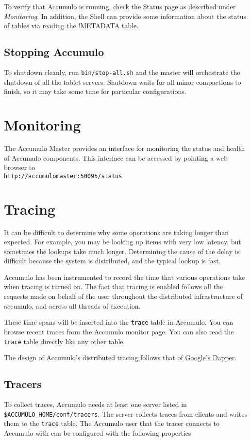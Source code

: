 To verify that Accumulo is running, check the Status page as described under
\emph{Monitoring}. In addition, the Shell can provide some information about the status of
tables via reading the !METADATA table.

\subsection{Stopping Accumulo}

To shutdown cleanly, run \texttt{bin/stop-all.sh} and the master will orchestrate the
shutdown of all the tablet servers. Shutdown waits for all minor compactions to finish, so it may
take some time for particular configurations.

\section{Monitoring}

The Accumulo Master provides an interface for monitoring the status and health of
Accumulo components. This interface can be accessed by pointing a web browser to\\
\texttt{http://accumulomaster:50095/status}

\section{Tracing}
It can be difficult to determine why some operations are taking longer
than expected. For example, you may be looking up items with very low
latency, but sometimes the lookups take much longer. Determining the
cause of the delay is difficult because the system is distributed, and
the typical lookup is fast.

Accumulo has been instrumented to record the time that various
operations take when tracing is turned on. The fact that tracing is
enabled follows all the requests made on behalf of the user throughout
the distributed infrastructure of accumulo, and across all threads of
execution.

These time spans will be inserted into the \texttt{trace} table in
Accumulo. You can browse recent traces from the Accumulo monitor
page. You can also read the \texttt{trace} table directly like any
other table.

The design of Accumulo's distributed tracing follows that of
\href{http://research.google.com/pubs/pub36356.html}{Google's Dapper}.

\subsection{Tracers}
To collect traces, Accumulo needs at least one server listed in
\\\texttt{\$ACCUMULO\_HOME/conf/tracers}. The server collects traces
from clients and writes them to the \texttt{trace} table. The Accumulo
user that the tracer connects to Accumulo with can be configured with
the following properties

